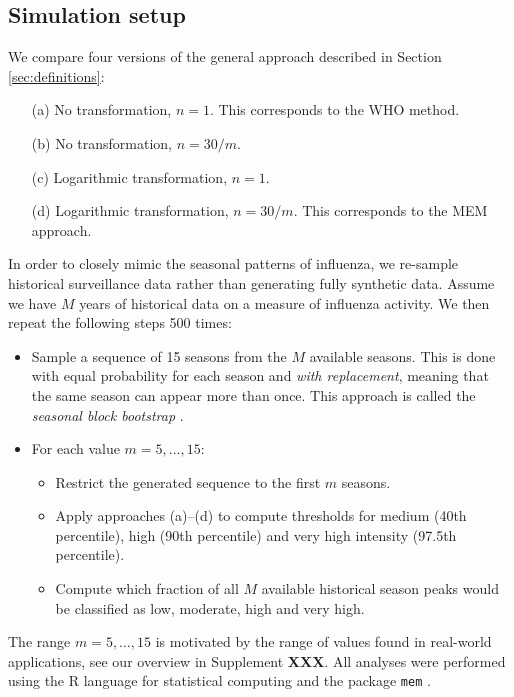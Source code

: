 \documentclass{article}
\begin{document}
\subsection{Simulation setup}
\label{subsec:simulation_setup}

We compare four versions of the general approach described in Section \ref{sec:definitions}:
\begin{enumerate}
\item[(a)] No transformation, $n = 1$. This corresponds to the WHO method.
\item[(b)] No transformation, $n = 30/m$.
\item[(c)] Logarithmic transformation, $n = 1$.
\item[(d)] Logarithmic transformation, $n = 30/m$. This corresponds to the MEM approach.
\end{enumerate}
In order to closely mimic the seasonal patterns of influenza, we re-sample historical surveillance data rather than generating fully synthetic data. Assume we have $M$ years of historical data on a measure of influenza activity. We then repeat the following steps 500 times:

\begin{itemize}
\item Sample a sequence of 15 seasons from the $M$ available seasons. This is done with equal probability for each season and \textit{with replacement}, meaning that the same season can appear more than once. This approach is called the \textit{seasonal block bootstrap} \citep{Politis2001}.
\item For each value $m = 5, \dots, 15$:
\begin{itemize}
\item Restrict the generated sequence to the first $m$ seasons.
\item Apply approaches (a)--(d) to compute thresholds for medium (40th percentile), high (90th percentile) and very high intensity (97.5th percentile).
\item Compute which fraction of all $M$ available historical season peaks would be classified as low, moderate, high and very high.
\end{itemize}
\end{itemize}
The range $m =5, \dots, 15$ is motivated by the range of values found in real-world applications, see our overview in Supplement \textbf{XXX}. All analyses were performed using the R language for statistical computing \citep{RCT2020} and the package \texttt{mem} \citep{Lozano2020}.
\end{document}
